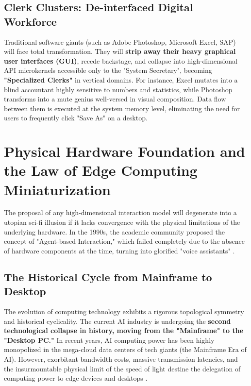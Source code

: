 \documentclass[11pt,a4paper]{article}
\begin{document}
\subsection{Clerk Clusters: De-interfaced Digital Workforce}

Traditional software giants (such as Adobe Photoshop, Microsoft Excel, SAP) will face total transformation. They will \textbf{strip away their heavy graphical user interfaces (GUI)}, recede backstage, and collapse into high-dimensional API microkernels accessible only to the "System Secretary", becoming \textbf{"Specialized Clerks"} in vertical domains. For instance, Excel mutates into a blind accountant highly sensitive to numbers and statistics, while Photoshop transforms into a mute genius well-versed in visual composition. Data flow between them is executed at the system memory level, eliminating the need for users to frequently click "Save As" on a desktop.

\section{Physical Hardware Foundation and the Law of Edge Computing Miniaturization}

The proposal of any high-dimensional interaction model will degenerate into a utopian sci-fi illusion if it lacks convergence with the physical limitations of the underlying hardware. In the 1990s, the academic community proposed the concept of "Agent-based Interaction," which failed completely due to the absence of hardware components at the time, turning into glorified "voice assistants" \cite{maes1994}.

\subsection{The Historical Cycle from Mainframe to Desktop}

The evolution of computing technology exhibits a rigorous topological symmetry and historical cyclicality. The current AI industry is undergoing the \textbf{second technological collapse in history, moving from the "Mainframe" to the "Desktop PC."} In recent years, AI computing power has been highly monopolized in the mega-cloud data centers of tech giants (the Mainframe Era of AI). However, exorbitant bandwidth costs, massive transmission latencies, and the insurmountable physical limit of the speed of light destine the delegation of computing power to edge devices and desktops \cite{shi2016}.
\end{document}

